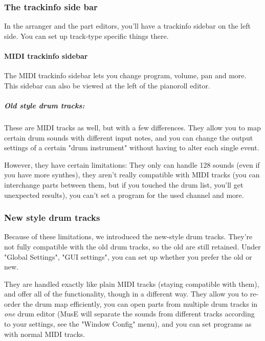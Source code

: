 \documentclass[a4paper]{report}
\begin{document}
\subsubsection{The trackinfo side bar}
In the arranger and the part editors, you'll have a trackinfo sidebar
on the left side. You can set up track-type specific things there.

\paragraph{MIDI trackinfo sidebar} \label{midi_trackinfo_sidebar}
The MIDI trackinfo sidebar lets you change program, volume, pan and
more. This sidebar can also be viewed at the left of the pianoroll
editor.                                                                        %
\subparagraph{Old style drum tracks:}
These are MIDI tracks as well, but with a few differences. They allow
you to map certain drum sounds with different input notes, and you
can change the output settings of a certain "drum instrument" without
having to alter each single event.

However, they have certain limitations: They only can handle 128 sounds
(even if you have more synthes), they aren't really compatible with
MIDI tracks (you can interchange parts between them, but if you touched
the drum list, you'll get unexpected results), you can't set a program
for the used channel and more.

\subsubsection{New style drum tracks}
Because of these limitations, we introduced the new-style drum tracks.
They're not fully compatible with the old drum tracks, so the old are
still retained. Under "Global Settings", "GUI settings", you can set
up whether you prefer the old or new.

They are handled exactly like plain MIDI tracks (staying compatible with
them), and offer all of the functionality, though in a different way.
They allow you to re-order the drum map efficiently, you can open parts
from multiple drum tracks in \emph{one} drum editor (MusE will separate
the sounds from different tracks according to your settings, see the
"Window Config" menu), and you can set programs as with normal MIDI tracks.
\end{document}
